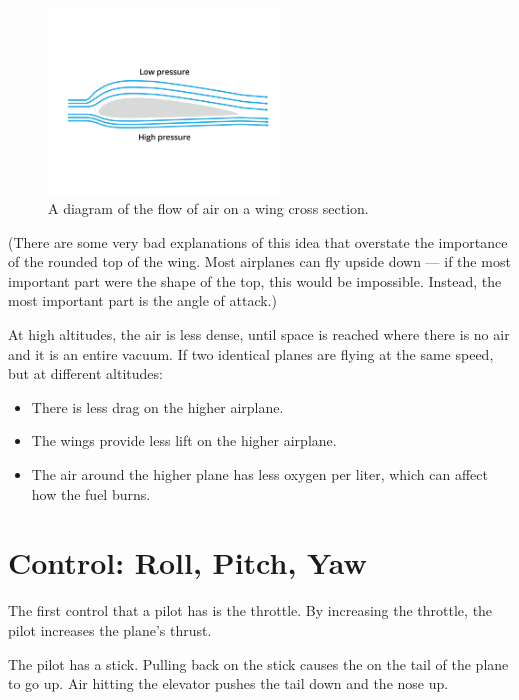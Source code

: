 \begin{figure}[htbp]
    \centering
    \includegraphics[width=0.55\textwidth]{airfoil.png}
    \caption{A diagram of the flow of air on a wing cross section.}\label{fig:airfoil}
\end{figure}



(There are some very bad explanations of this idea that overstate the importance of the rounded top of the wing. Most airplanes can fly upside down --- if the
most important part were the shape of the top, this would be impossible. Instead, the most important part is the angle of attack.)


At high altitudes, the air is less dense, until space is reached where there is no air and it is an entire vacuum. If two identical planes are flying at the same speed, but at different altitudes:
\begin{itemize}
\item There is less drag on the higher airplane.
\item The wings provide less lift on the higher airplane.
\item The air around the higher plane has less oxygen per liter, which can affect how the fuel burns.
\end{itemize}

\section{Control: Roll, Pitch, Yaw}
The first control that a pilot has is the throttle. By increasing the throttle, the pilot increases the plane's thrust.

The pilot has a stick. Pulling back on the stick causes the  on the tail of the plane to go up. Air hitting the elevator pushes the tail down and the nose up.

